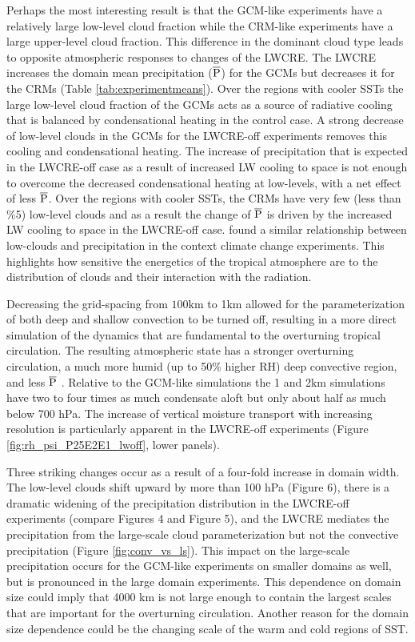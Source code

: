\documentclass[draft]{agujournal2019}
\begin{document}
{Perhaps the most interesting result is that the GCM-like experiments have a relatively large low-level 
cloud fraction while the CRM-like experiments have a large upper-level cloud fraction.  
This difference in the dominant cloud type leads to opposite atmospheric responses to changes of the LWCRE.  
The LWCRE increases the domain mean precipitation ($\overline{\rm{P}}$) for the GCMs but 
decreases it for the CRMs (Table \ref{tab:experimentmeans}).  
Over the regions with cooler SSTs the large low-level cloud fraction of the GCMs 
acts as a source of radiative cooling that is balanced by condensational heating in the control case.  
A strong decrease of low-level clouds in the GCMs
for the LWCRE-off experiments removes this cooling and condensational heating.  The increase 
of precipitation that is expected in the LWCRE-off case as a result of increased LW cooling to space is not enough
to overcome the decreased condensational heating at low-levels, with a net effect of less $\overline{\rm{P}}$.  
Over the regions with cooler SSTs, the CRMs have very few (less than \%5) low-level clouds and as a result the 
change of $\overline{\rm{P}}$ is driven by the increased LW cooling to space in the LWCRE-off case.
 found a similar relationship between low-clouds and precipitation in the context climate 
change experiments.
This highlights how sensitive the energetics of the tropical atmosphere are to the distribution of clouds and 
their interaction with the radiation.      

Decreasing the grid-spacing from $100 \textrm{km}$ to 1km allowed for the parameterization of both deep and shallow 
convection to be turned off, resulting in a more direct simulation of the dynamics that are
fundamental to the overturning tropical circulation.  The resulting atmospheric state has a stronger overturning 
circulation, a much more humid (up to 50\% higher RH) deep convective region, and less $\overline{\rm{P}}$ .  
Relative to the GCM-like simulations the 1 and 2km simulations have two to four times as much condensate
aloft but only about half as much below 700 hPa.  The increase of vertical moisture transport with increasing 
resolution is particularly apparent in the LWCRE-off experiments (Figure \ref{fig:rh_psi_P25E2E1_lwoff}, lower panels).   

Three striking changes occur as a result of a four-fold increase in domain width.  The low-level clouds shift 
upward by more than 100 hPa (Figure 6), there is a dramatic widening of the precipitation distribution in the LWCRE-off experiments 
(compare Figures 4 and Figure 5),  
and the LWCRE mediates the precipitation from the large-scale cloud parameterization but not the convective precipitation (Figure \ref{fig:conv_vs_ls}).    
This impact on the large-scale precipitation occurs for the GCM-like experiments on smaller domains as well, 
but is pronounced in the large domain experiments.  
This dependence on domain size could imply that 4000 km is not large enough to contain the largest 
scales that are important for the overturning circulation.  Another reason for the domain 
size dependence could be the changing scale of the warm and cold regions of SST.  

}
\end{document}
